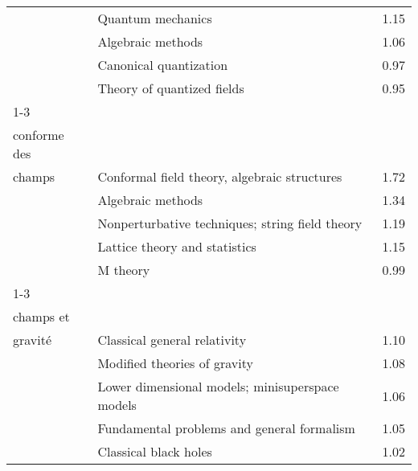 \begin{longtable}[H]{p{}|p{}|p{}}
                                                                               & Quantum mechanics &  1.15 \\
                                                                               & Algebraic methods &  1.06 \\
                                                                               & Canonical quantization &  0.97 \\
                                                                               & Theory of quantized fields &  0.95 \\
\cline{1-3}
\multirow{5}{*}{\begin{tabular}{l}Théorie\\ conforme des\\ champs\end{tabular}} & Conformal field theory, algebraic structures &  1.72 \\
                                                                               & Algebraic methods &  1.34 \\
                                                                               & Nonperturbative techniques; string field theory &  1.19 \\
                                                                               & Lattice theory and statistics &  1.15 \\
                                                                               & M theory &  0.99 \\
\cline{1-3}
\multirow{5}{*}{\begin{tabular}{l}Théorie des\\ champs et\\ gravité\end{tabular}} & Classical general relativity &  1.10 \\
                                                                               & Modified theories of gravity &  1.08 \\
                                                                               & Lower dimensional models; minisuperspace models &  1.06 \\
                                                                               & Fundamental problems and general formalism &  1.05 \\
                                                                               & Classical black holes &  1.02 \\

\end{longtable}
